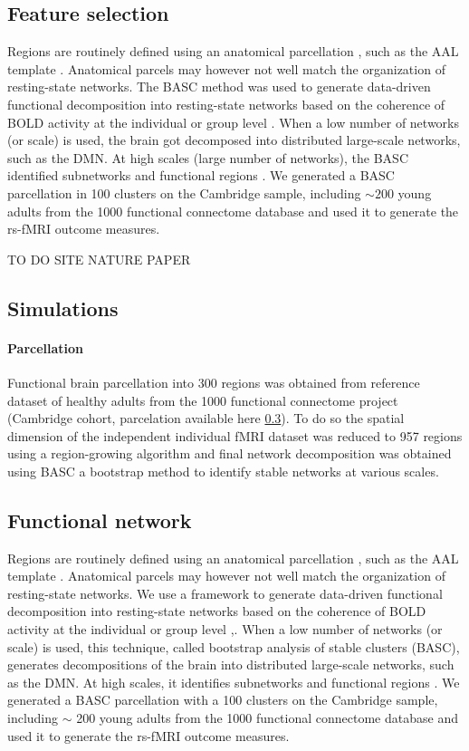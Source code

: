 \documentclass[authoryear]{elsarticle}
\begin{document}
\subsection{Feature selection}
Regions are routinely defined using an anatomical parcellation \citep{He2009}, such as the AAL template \citep{Tzourio-Mazoyer2002}. Anatomical parcels may however not well match the organization of resting-state networks. The BASC method was used to generate data-driven functional decomposition into resting-state networks based on the coherence of BOLD activity at the individual or group level \citep{Bellec2006,Bellec2010c,Bellec2013}. When a low number of networks (or scale) is used, the brain got decomposed into distributed large-scale networks, such as the DMN. At high scales (large number of networks), the BASC identified subnetworks and functional regions \citep{Kelly2012}. We generated a BASC parcellation in 100 clusters on the Cambridge sample, including $\sim 200$ young adults from the 1000 functional connectome database \citep{Biswal2010} and used it to generate the rs-fMRI outcome measures.

TO DO SITE NATURE PAPER

\subsection{Simulations}


\paragraph{Parcellation}
Functional brain parcellation into 300 regions was obtained from reference dataset of healthy adults from the 1000 functional connectome project (Cambridge cohort, parcelation available here \ref{}). To do so the spatial dimension of the independent individual fMRI dataset was reduced to 957 regions using a region-growing algorithm \cite{Bellec2006} and final network decomposition was obtained using BASC \cite{Bellec2010c} a bootstrap method to identify stable networks at various scales.

\subsection{Functional network}
Regions are routinely defined using an anatomical parcellation \citep{He2009}, such as the AAL template \citep{Tzourio-Mazoyer2002}. Anatomical parcels may however not well match the organization of resting-state networks. We use a framework to generate data-driven functional decomposition into resting-state networks based on the coherence of BOLD activity at the individual or group level \citep{Bellec2006},\citep{Bellec2010c}. When a low number of networks (or scale) is used, this technique, called bootstrap analysis of stable clusters (BASC), generates decompositions of the brain into distributed large-scale networks, such as the DMN. At high scales, it identifies subnetworks and functional regions \citep{Kelly2012}. We generated a BASC parcellation with a 100 clusters on the Cambridge sample, including $\sim$ 200 young adults from the 1000 functional connectome database \citep{Biswal2010} and used it to generate the rs-fMRI outcome measures.
\end{document}
